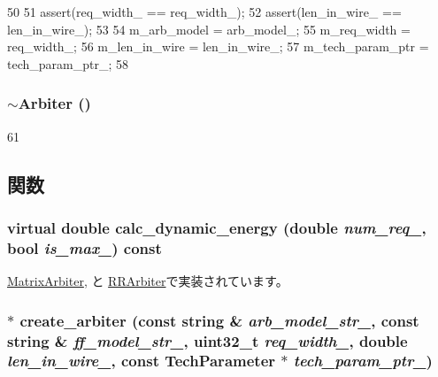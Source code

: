 \begin{DoxyCode}
50 {
51     assert(req_width_ == req_width_);
52     assert(len_in_wire_ == len_in_wire_);
53 
54     m_arb_model = arb_model_;
55     m_req_width = req_width_;
56     m_len_in_wire = len_in_wire_;
57     m_tech_param_ptr = tech_param_ptr_;
58 }
\end{DoxyCode}
\hypertarget{classArbiter_aaae2c33d2f343df7d91f433cdcc6cba8}{
\subsubsection[{$\sim$Arbiter}]{\setlength{\rightskip}{0pt plus 5cm}$\sim${\bf Arbiter} ()}}
\label{classArbiter_aaae2c33d2f343df7d91f433cdcc6cba8}



\begin{DoxyCode}
61 {}
\end{DoxyCode}


\subsection{関数}
\hypertarget{classArbiter_a11ad46c0a5f20df98190b479117a7dee}{
\subsubsection[{calc\_\-dynamic\_\-energy}]{\setlength{\rightskip}{0pt plus 5cm}virtual double calc\_\-dynamic\_\-energy (double {\em num\_\-req\_\-}, \/  bool {\em is\_\-max\_\-}) const}}
\label{classArbiter_a11ad46c0a5f20df98190b479117a7dee}


\hyperlink{classMatrixArbiter_adf7ecbfcfee50be4847889bf0bc725b1}{MatrixArbiter}, と \hyperlink{classRRArbiter_adf7ecbfcfee50be4847889bf0bc725b1}{RRArbiter}で実装されています。\hypertarget{classArbiter_a6482e81df871b0da383d2a5b4018fe62}{
\subsubsection[{create\_\-arbiter}]{ $\ast$ create\_\-arbiter (const string \& {\em arb\_\-model\_\-str\_\-}, \/  const string \& {\em ff\_\-model\_\-str\_\-}, \/  {\bf uint32\_\-t} {\em req\_\-width\_\-}, \/  double {\em len\_\-in\_\-wire\_\-}, \/  const {\bf TechParameter} $\ast$ {\em tech\_\-param\_\-ptr\_\-})}}
\label{classArbiter_a6482e81df871b0da383d2a5b4018fe62}



